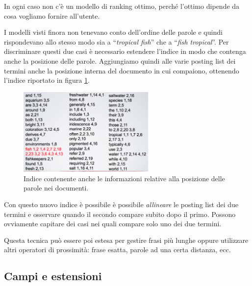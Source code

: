 



In ogni caso non c'è un modello di ranking ottimo, perché l'ottimo dipende da cosa vogliamo fornire all'utente.

I modelli visti finora non tenevano conto dell'ordine delle parole e quindi rispondevano allo stesso modo sia a ``\textit{tropical fish}'' che a ``\textit{fish tropical}''.
Per discriminare questi due casi è necessario estendere l'indice in modo che contenga anche la posizione delle parole. Aggiungiamo quindi alle varie posting list dei termini anche la posizione interna del documento in cui compaiono, ottenendo l'indice riportato in figura \ref{fig:index-pos}.

\begin{figure}[htbp]
	\centering
	\includegraphics[width=0.6\textwidth]{./images/l7-indice-pos}
	\caption{Indice contenente anche le informazioni relative alla posizione delle parole nei documenti.}\label{fig:index-pos}
\end{figure}

Con questo nuovo indice è possibile è possibile \textit{allineare} le posting list dei due termini e osservare quando il secondo compare subito dopo il primo.
Possono ovviamente capitare dei casi nei quali compare solo uno dei due termini.

Questa tecnica può essere poi estesa per gestire frasi più lunghe oppure utilizzare altri operatori di prossimità: frase esatta, parole ad una certa distanza, ecc.

\subsection{Campi e estensioni}

